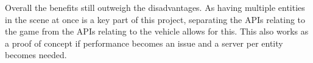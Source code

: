 Overall the benefits still outweigh the disadvantages. As having multiple entities in the scene at once is a key part of this project, separating the APIs relating to the game from the APIs relating to the vehicle allows for this. This also works as a proof of concept if performance becomes an issue and a server per entity becomes needed. 





